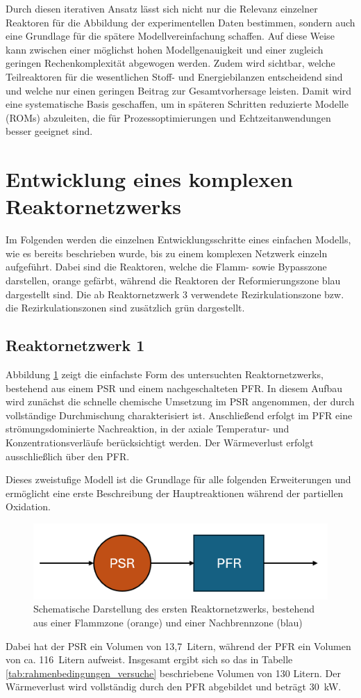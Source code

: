         Durch diesen iterativen Ansatz lässt sich nicht nur die Relevanz einzelner Reaktoren für die Abbildung der experimentellen Daten bestimmen, sondern auch eine Grundlage für die spätere Modellvereinfachung schaffen. Auf diese Weise kann zwischen einer möglichst hohen Modellgenauigkeit und einer zugleich geringen Rechenkomplexität abgewogen werden. Zudem wird sichtbar, welche Teilreaktoren für die wesentlichen Stoff- und Energiebilanzen entscheidend sind und welche nur einen geringen Beitrag zur Gesamtvorhersage leisten. Damit wird eine systematische Basis geschaffen, um in späteren Schritten reduzierte Modelle (ROMs) abzuleiten, die für Prozessoptimierungen und Echtzeitanwendungen besser geeignet sind.
\fi 
    \section*{Entwicklung eines komplexen Reaktornetzwerks}
        \label{sec:erweiterung_rom}
        Im Folgenden werden die einzelnen Entwicklungsschritte eines einfachen Modells, wie es bereits beschrieben wurde, bis zu einem komplexen Netzwerk einzeln aufgeführt. Dabei sind die Reaktoren, welche die Flamm- sowie Bypasszone darstellen, orange gefärbt, während die Reaktoren der Reformierungszone blau dargestellt sind. Die ab Reaktornetzwerk 3 verwendete Rezirkulationszone bzw. die Rezirkulationszonen sind zusätzlich grün dargestellt.
        \subsection*{Reaktornetzwerk 1}
            Abbildung \ref{fig:reaktornetzwerk1} zeigt die einfachste Form des untersuchten Reaktornetzwerks, bestehend aus einem PSR und einem nachgeschalteten PFR. In diesem Aufbau wird zunächst die schnelle chemische Umsetzung im PSR angenommen, der durch vollständige Durchmischung charakterisiert ist. Anschließend erfolgt im PFR eine strömungsdominierte Nachreaktion, in der axiale Temperatur- und Konzentrationsverläufe berücksichtigt werden. Der Wärmeverlust erfolgt ausschließlich über den PFR.

            Dieses zweistufige Modell ist die Grundlage für alle folgenden Erweiterungen und ermöglicht eine erste Beschreibung der Hauptreaktionen während der partiellen Oxidation.
            \begin{figure}[H]
                \centering
                \includegraphics[width=0.7\linewidth]{img/Erweiterungen/1.png}
                \caption{Schematische Darstellung des ersten Reaktornetzwerks, bestehend aus einer Flammzone (orange) und einer Nachbrennzone (blau)}
                \label{fig:reaktornetzwerk1}
            \end{figure}
            Dabei hat der PSR ein Volumen von 13,7~Litern, während der PFR ein Volumen von ca. 116~Litern aufweist. Insgesamt ergibt sich so das in Tabelle \ref{tab:rahmenbedingungen_versuche} beschriebene Volumen von 130 Litern. Der Wärmeverlust wird vollständig durch den PFR abgebildet und beträgt 30~kW. 
